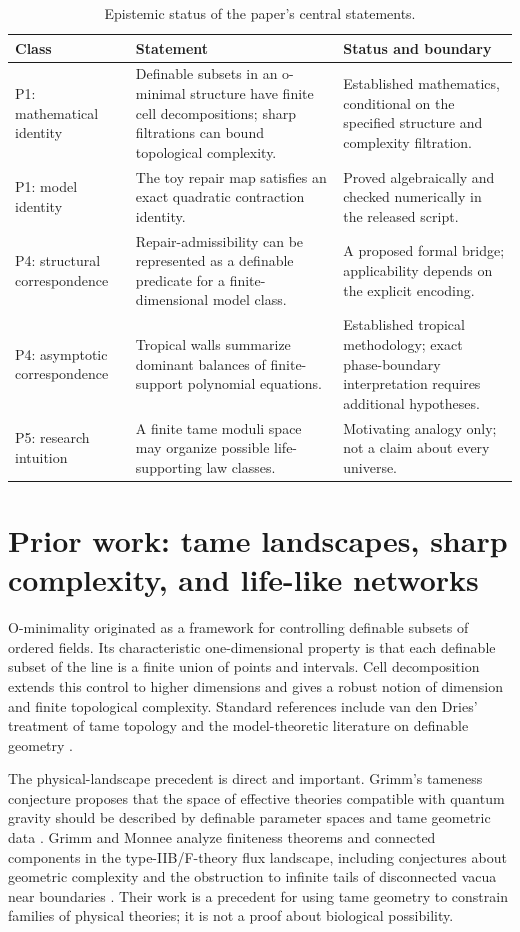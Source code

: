 \documentclass[11pt,a4paper]{article}
\theoremstyle{definition}
\theoremstyle{remark}
\begin{document}
\begin{table}[H]
\centering\small
\caption{Epistemic status of the paper's central statements.}
\begin{tabularx}{\textwidth}{@{}p{}p{}X@{}}
\toprule
Class & Statement & Status and boundary \\
\midrule
P1: mathematical identity & Definable subsets in an o-minimal structure have finite cell decompositions; sharp filtrations can bound topological complexity. & Established mathematics, conditional on the specified structure and complexity filtration.\\
P1: model identity & The toy repair map satisfies an exact quadratic contraction identity. & Proved algebraically and checked numerically in the released script.\\
P4: structural correspondence & Repair-admissibility can be represented as a definable predicate for a finite-dimensional model class. & A proposed formal bridge; applicability depends on the explicit encoding.\\
P4: asymptotic correspondence & Tropical walls summarize dominant balances of finite-support polynomial equations. & Established tropical methodology; exact phase-boundary interpretation requires additional hypotheses.\\
P5: research intuition & A finite tame moduli space may organize possible life-supporting law classes. & Motivating analogy only; not a claim about every universe.\\
\bottomrule
\end{tabularx}
\end{table}

\section{Prior work: tame landscapes, sharp complexity, and life-like networks}
O-minimality originated as a framework for controlling definable subsets of ordered fields. Its characteristic one-dimensional property is that each definable subset of the line is a finite union of points and intervals. Cell decomposition extends this control to higher dimensions and gives a robust notion of dimension and finite topological complexity. Standard references include van den Dries' treatment of tame topology and the model-theoretic literature on definable geometry \cite{vanDenDries1998,coste1999}.

The physical-landscape precedent is direct and important. Grimm's tameness conjecture proposes that the space of effective theories compatible with quantum gravity should be described by definable parameter spaces and tame geometric data \cite{grimm2022}. Grimm and Monnee analyze finiteness theorems and connected components in the type-IIB/F-theory flux landscape, including conjectures about geometric complexity and the obstruction to infinite tails of disconnected vacua near boundaries \cite{grimmMonnee2024}. Their work is a precedent for using tame geometry to constrain families of physical theories; it is not a proof about biological possibility.
\end{document}
